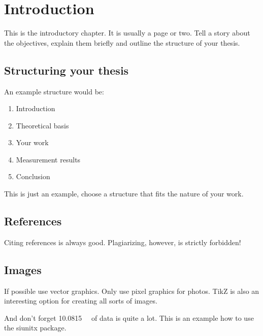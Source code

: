 \chapter{Introduction}
This is the introductory chapter.
It is usually a page or two.
Tell a story about the objectives, explain them briefly and outline the structure of your thesis.

\section{Structuring your thesis}

An example structure would be:
\begin{enumerate}
\item Introduction
\item Theoretical basis
\item Your work
\item Measurement results
\item Conclusion
\end{enumerate}

This is just an example, choose a structure that fits the nature of your work.

\section{References}
Citing references is always good. Plagiarizing, however, is strictly forbidden!

\section{Images}
If possible use vector graphics. Only use pixel graphics for photos. TikZ is also an interesting option for creating all sorts of images.

And don't forget \SI{10.0815}{\giga\byte} of data is quite a lot.
This is an example how to use the siunitx package.


